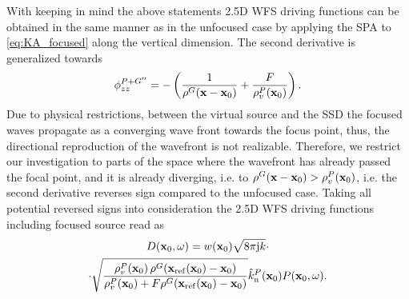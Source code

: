 \documentclass[lettersize,journal]{IEEEtran}
\begin{document}
With keeping in mind the above statements 2.5D WFS driving functions can be obtained in the same manner as in the unfocused case by applying the SPA to \eqref{eq:KA_focused} along the vertical dimension.
The second derivative is generalized towards
\begin{equation}
  \phi^{P+G''}_{zz} = -\left( \frac{1}{\rho^G(\mathbf{x}-\mathbf{x}_0)} + \frac{F}{\rho^P_v(\mathbf{x}_0)} \right).
\end{equation}
Due to physical restrictions, between the virtual source and the SSD the focused waves propagate as a converging wave front towards the focus point, thus, the directional reproduction of the wavefront is not realizable.
Therefore, we restrict our investigation to parts of the space where the wavefront has already passed the focal point, and it is already diverging, i.e. to  $\rho^G(\mathbf{x}-\mathbf{x}_0) > \rho^P_v(\mathbf{x}_0)$, i.e. the second derivative reverses sign compared to the unfocused case.
Taking all potential reversed signs into consideration the 2.5D WFS driving functions including focused source read as 
\begin{multline}
  \small
  D(\mathbf{x}_0,\omega) = w(\mathbf{x}_0) \sqrt{8\pi \mathrm{j} k} \cdot
  \\  \cdot \sqrt{\frac{ \rho^P_v(\mathbf{x}_0) \, \rho^G(\mathbf{x}_{\mathrm{ref}}(\mathbf{x}_0)-\mathbf{x}_0) }{ \rho^P_v(\mathbf{x}_0) + F \rho^G(\mathbf{x}_{\mathrm{ref}}(\mathbf{x}_0)-\mathbf{x}_0)} } \hat{k}_\mathrm{n}^P(\mathbf{x}_0) P(\mathbf{x}_0, \omega).
  \label{eq:foc_driv_fun}
\end{multline}
\end{document}
